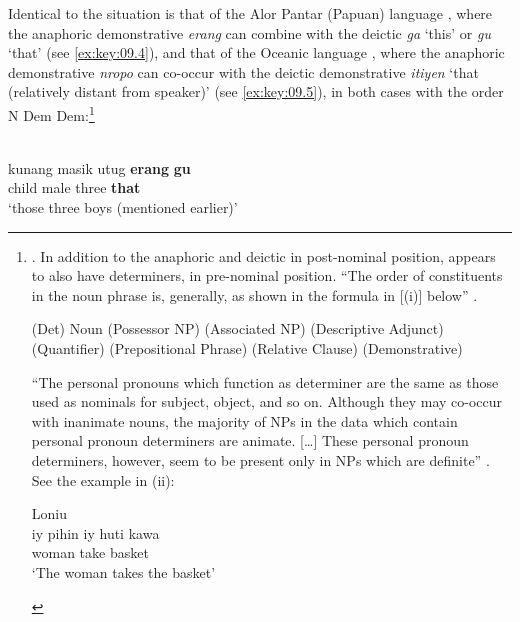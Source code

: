 \documentclass[output=paper]{langsci/langscibook}
\begin{document}
Identical to the  situation is that of the Alor Pantar (Papuan)
language , where the anaphoric demonstrative \emph{erang}
can combine with the deictic  \emph{ga} ‘this’ or \emph{gu}
‘that’ \parencite[§4]{Klamer2014} (see \eqref{ex:key:09.4}), and that of the Oceanic language
 \parencite[§4.3.7]{Hamel1994}, where the anaphoric
demonstrative \emph{nropo} can co-occur with the deictic demonstrative
\emph{itiyen} `that (relatively distant from speaker)' (see \eqref{ex:key:09.5}), in both cases
with the order N Dem Dem:\footnote{
    \parencite[99]{Hamel1994}.  In addition to the anaphoric and deictic
     in post-nominal position,  appears to also have
    determiners, in pre-nominal position.  \enquote{The order of constituents
        in the noun phrase is, generally, as shown in the formula in [(i)]
    below} \parencite[89]{Hamel1994}.

\begin{exe}
    (Det) Noun (Possessor NP) (Associated NP) (Descriptive Adjunct)
    (Quantifier) (Prepositional Phrase) (Relative Clause) (Demonstrative)
\end{exe}

\enquote{The personal pronouns which function as determiner are the same as
    those used as nominals for subject, object, and so on. Although they may
    co-occur with inanimate nouns, the majority of NPs in the data which
    contain personal pronoun determiners are animate. [\dots] These
personal pronoun determiners, however, seem to be present only in NPs which are
definite} \parencite[90]{Hamel1994}. See the example in (ii):

\begin{exe}
     Loniu\\
	\gll iy   pihin      iy    huti kawa\\
		\Tsg{} woman \Tsg{} take basket\\
	\glt ‘The woman takes the basket’
\end{exe}\label{fn:9.5}}

\ea {} \parencite[120]{Klamer2014}\label{ex:key:09.4}\\
	\gll kunang   masik     utug \textbf{erang} \textbf{gu} \\
        child  male three \textbf{\Dem{}} \textbf{that}\\
	\glt ‘those three boys (mentioned earlier)’
\z
\end{document}
